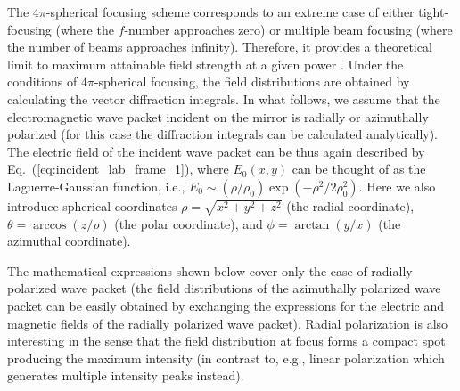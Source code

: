 \documentclass[10pt, a4paper, twoside, openright]{report}
\begin{document}
The $ 4 \pi $-spherical focusing scheme corresponds to an extreme case of either tight-focusing (where the $ f $-number approaches zero) or multiple beam focusing (where the number of beams approaches infinity). Therefore, it provides a theoretical limit to maximum attainable field strength at a given power \cite{Jeong2020}. Under the conditions of $ 4 \pi $-spherical focusing, the field distributions are obtained by calculating the vector diffraction integrals. In what follows, we assume that the electromagnetic wave packet incident on the mirror is radially or azimuthally polarized (for this case the diffraction integrals can be calculated analytically). The electric field of the incident wave packet can be thus again described by Eq.~(\ref{eq:incident_lab_frame_1}), where $ E_0 \left(x, y \right) $ can be thought of as the Laguerre-Gaussian function, i.e., $ E_0 \sim \left( \rho / \rho_0 \right)\exp \left( - \rho^2 / 2 \rho_0^2 \right)$. Here we also introduce spherical coordinates $ \rho = \sqrt{x^2 + y^2 + z^2} $ (the radial coordinate), $ \theta = \arccos \left( z / \rho \right)$ (the polar coordinate), and $ \phi = \arctan \left( y / x \right)$ (the azimuthal coordinate).

The mathematical expressions shown below cover only the case of radially polarized wave packet (the field distributions of the azimuthally polarized wave packet can be easily obtained by exchanging the expressions for the electric and magnetic fields of the radially polarized wave packet). Radial polarization is also interesting in the sense that the field distribution at focus forms a compact spot producing the maximum intensity (in contrast to, e.g., linear polarization which generates multiple intensity peaks instead).
\end{document}
